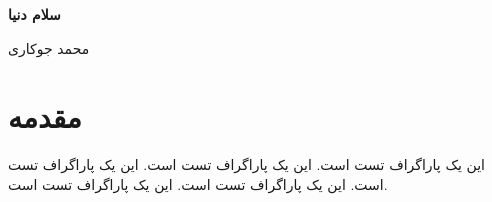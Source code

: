 \documentclass[10pt]{article}
\begin{document}
\begin{center}
{\Large\bfseries سلام دنیا}\par
\vspace{4pt}
محمد جوکاری\par
{}
\end{center}
\begin{abstract}
این یک تست است.
\end{abstract}
\twocolumn
\section{مقدمه}
این یک پاراگراف تست است. این یک پاراگراف تست است. این یک پاراگراف تست است. این یک پاراگراف تست است. این یک پاراگراف تست است.
\end{document}

